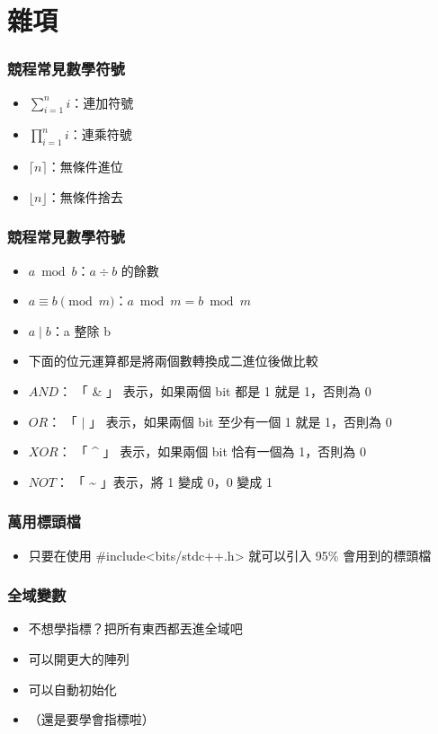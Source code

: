 \documentclass{beamer}
\begin{document}
\section{雜項}

\begin{frame}
    \frametitle{競程常見數學符號}
    \begin{itemize}
        \item $\displaystyle\sum_{i=1}^{n} i$：連加符號
        \item $\displaystyle\prod_{i=1}^{n} i$：連乘符號
        \vspace{0.5cm}
        \item<2-> $\lceil n \rceil$：無條件進位
        \item<2-> $\lfloor n \rfloor$：無條件捨去
    \end{itemize}
\end{frame}

\begin{frame}
    \frametitle{競程常見數學符號}
    \begin{itemize}
        \item $a \bmod b$：$a \div b$ 的餘數
        \item $a \equiv b \pmod{m}$：$a \bmod m = b \bmod m$
        \item $a \mid b$：a 整除 b
        \vspace{0.5cm}
        \item<2-> 下面的位元運算都是將兩個數轉換成二進位後做比較
        \item<2-> $AND$： 「 \& 」 表示，如果兩個 bit 都是 1 就是 1，否則為 0
        \item<2-> $OR$： 「 $\mid$ 」 表示，如果兩個 bit 至少有一個 1 就是 1，否則為 0
        \item<2-> $XOR$： 「 \^{} 」 表示，如果兩個 bit 恰有一個為 1，否則為 0
        \item<2-> $NOT$： 「 \~{} 」表示，將 1 變成 0，0 變成 1
    \end{itemize}
\end{frame}

\begin{frame}
    \frametitle{萬用標頭檔}
    \begin{itemize}
        \item 只要在使用 \#include<bits/stdc++.h> 就可以引入 95\% 會用到的標頭檔
    \end{itemize}
\end{frame}

\begin{frame}
    \frametitle{全域變數}
    \begin{itemize}
        \item 不想學指標？把所有東西都丟進全域吧
        \item 可以開更大的陣列
        \item 可以自動初始化
        \item （還是要學會指標啦）
    \end{itemize}
\end{frame}
\end{document}
